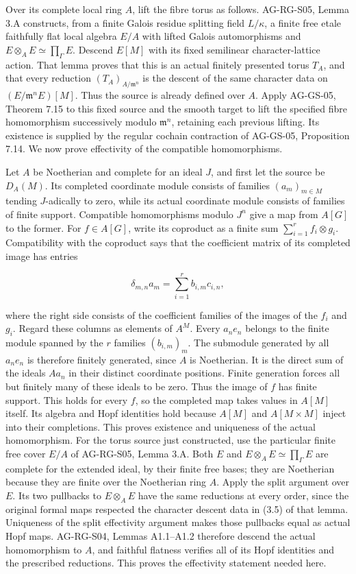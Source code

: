 \documentclass[11pt,a4paper,openany]{report}
\begin{document}
Over its complete local ring \(A\), lift the fibre torus as follows. AG-RG-S05, Lemma 3.A constructs, from a finite Galois residue splitting field \(L/\kappa\), a finite free etale faithfully flat local algebra \(E/A\) with lifted Galois automorphisms and \(E\otimes_AE\simeq\prod_\Gamma E\). Descend \(E[M]\) with its fixed semilinear character-lattice action. That lemma proves that this is an actual finitely presented torus \(T_A\), and that every reduction \((T_A)_{A/\mathfrak m^n}\) is the descent of the same character data on \((E/\mathfrak m^nE)[M]\). Thus the source is already defined over \(A\). Apply AG-GS-05, Theorem 7.15 to this fixed source and the smooth target to lift the specified fibre homomorphism successively modulo \(\mathfrak m^n\), retaining each previous lifting. Its existence is supplied by the regular cochain contraction of AG-GS-05, Proposition 7.14. We now prove effectivity of the compatible homomorphisms.

Let \(A\) be Noetherian and complete for an ideal \(J\), and first let the source be \(D_A(M)\). Its completed coordinate module consists of families \((a_m)_{m\in M}\) tending \(J\)-adically to zero, while its actual coordinate module consists of families of finite support. Compatible homomorphisms modulo \(J^n\) give a map from \(A[G]\) to the former. For \(f\in A[G]\), write its coproduct as a finite sum \(\sum_{i=1}^r f_i\otimes g_i\). Compatibility with the coproduct says that the coefficient matrix of its completed image has entries

\[
\delta_{m,n}a_m=\sum_{i=1}^r b_{i,m}c_{i,n},
\tag{3.1}
\]

where the right side consists of the coefficient families of the images of the \(f_i\) and \(g_i\). Regard these columns as elements of \(A^M\). Every \(a_ne_n\) belongs to the finite module spanned by the \(r\) families \((b_{i,m})_m\). The submodule generated by all \(a_ne_n\) is therefore finitely generated, since \(A\) is Noetherian. It is the direct sum of the ideals \(Aa_n\) in their distinct coordinate positions. Finite generation forces all but finitely many of these ideals to be zero. Thus the image of \(f\) has finite support. This holds for every \(f\), so the completed map takes values in \(A[M]\) itself. Its algebra and Hopf identities hold because \(A[M]\) and \(A[M\times M]\) inject into their completions. This proves existence and uniqueness of the actual homomorphism. For the torus source just constructed, use the particular finite free cover \(E/A\) of AG-RG-S05, Lemma 3.A. Both \(E\) and \(E\otimes_AE\simeq\prod_\Gamma E\) are complete for the extended ideal, by their finite free bases; they are Noetherian because they are finite over the Noetherian ring \(A\). Apply the split argument over \(E\). Its two pullbacks to \(E\otimes_AE\) have the same reductions at every order, since the original formal maps respected the character descent data in (3.5) of that lemma. Uniqueness of the split effectivity argument makes those pullbacks equal as actual Hopf maps. AG-RG-S04, Lemmas A1.1--A1.2 therefore descend the actual homomorphism to \(A\), and faithful flatness verifies all of its Hopf identities and the prescribed reductions. This proves the effectivity statement needed here.
\end{document}
